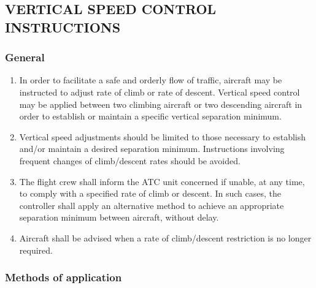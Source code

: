 \subsection[Vertical speed control instructions]{VERTICAL SPEED CONTROL INSTRUCTIONS}

\subsubsection{General}

\begin{enumerate}
    \item In order to facilitate a safe and orderly flow of traffic, aircraft may be instructed to adjust rate of climb or rate of descent. Vertical speed control may be applied between two climbing aircraft or two descending aircraft in order to establish or maintain a specific vertical separation minimum.
    \item Vertical speed adjustments should be limited to those necessary to establish and/or maintain a desired separation minimum. Instructions involving frequent changes of climb/descent rates should be avoided.
    \item The flight crew shall inform the ATC unit concerned if unable, at any time, to comply with a specified rate of climb or descent. In such cases, the controller shall apply an alternative method to achieve an appropriate separation minimum between aircraft, without delay.
    \item Aircraft shall be advised when a rate of climb/descent restriction is no longer required.
\end{enumerate}

\subsubsection{Methods of application}

